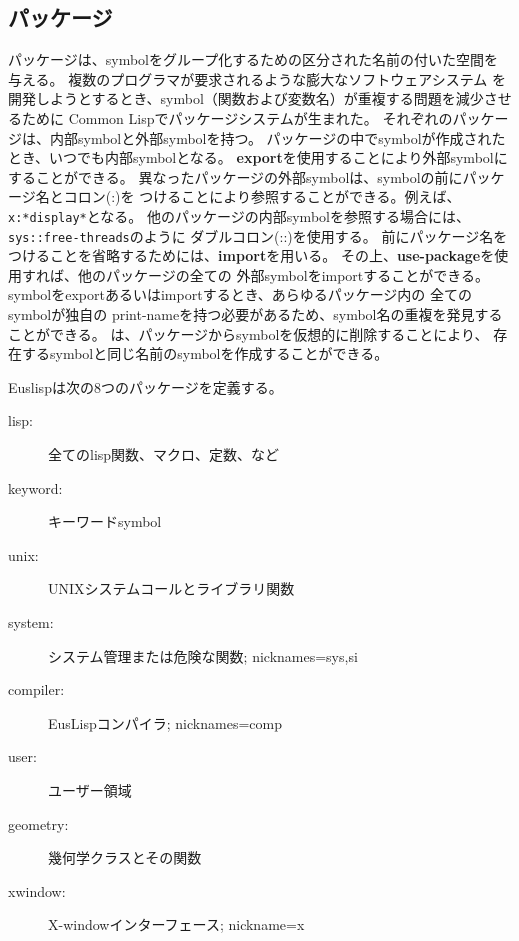 \begin{refdesc}



\end{refdesc}

\subsection{パッケージ}

パッケージは、symbolをグループ化するための区分された名前の付いた空間を与える。
複数のプログラマが要求されるような膨大なソフトウェアシステム
を開発しようとするとき、symbol（関数および変数名）が重複する問題を減少させるために
Common Lispでパッケージシステムが生まれた。
それぞれのパッケージは、内部symbolと外部symbolを持つ。
パッケージの中でsymbolが作成されたとき、いつでも内部symbolとなる。
{\bf export}を使用することにより外部symbolにすることができる。
異なったパッケージの外部symbolは、symbolの前にパッケージ名とコロン(:)を
つけることにより参照することができる。例えば、{\tt x:*display*}となる。
他のパッケージの内部symbolを参照する場合には、{\tt sys::free-threads}のように
ダブルコロン(::)を使用する。
前にパッケージ名をつけることを省略するためには、{\bf import}を用いる。
その上、{\bf use-package}を使用すれば、他のパッケージの全ての
外部symbolをimportすることができる。
symbolをexportあるいはimportするとき、あらゆるパッケージ内の
全てのsymbolが独自の
print-nameを持つ必要があるため、symbol名の重複を発見することができる。
は、パッケージからsymbolを仮想的に削除することにより、
存在するsymbolと同じ名前のsymbolを作成することができる。

Euslispは次の8つのパッケージを定義する。
\begin{description}
\item [lisp:] 全てのlisp関数、マクロ、定数、など
\item [keyword:] キーワードsymbol
\item [unix:] UNIXシステムコールとライブラリ関数
\item [system:] システム管理または危険な関数; nicknames=sys,si
\item [compiler:] EusLispコンパイラ; nicknames=comp
\item [user:] ユーザー領域
\item [geometry:] 幾何学クラスとその関数
\item [xwindow:] X-windowインターフェース; nickname=x
\end{description}

